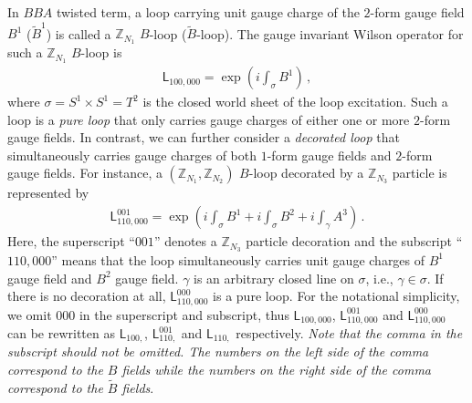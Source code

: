 \documentclass[11pt,nofootinbib,preprint]{revtex4-1}
\begin{document}
In $BBA$ twisted term, a loop carrying unit gauge charge of the $2$-form gauge field $B^1$ ($\tilde{B}^1$) is called a $\mathbb{Z} _{N_1}$ $B$-loop ($\tilde{B}$-loop). The gauge invariant Wilson operator for such a $\mathbb{Z} _{N_1}$ $B$-loop is
\begin{align}
	\mathsf{L}_{100,000}=\exp \left( i\int_{\sigma}{B^1} \right)\,,
\end{align}
where $\sigma=S^1\times S^1=T^2$ is the closed world sheet of the loop excitation.  Such a loop is a \textit{pure loop} that only carries gauge charges of  either one or more $2$-form gauge fields.  In contrast, we can  further  consider a \textit{decorated loop} that simultaneously carries gauge charges of both $1$-form gauge fields and $2$-form gauge fields. For instance, a $\left( \mathbb{Z} _{N_1},\mathbb{Z} _{N_2} \right)$ $B$-loop decorated by a $\mathbb{Z} _{N_3}$ particle is represented by
\begin{align}
	\mathsf{L}_{110,000}^{001}=\exp \left( i\int_{\sigma}{B^1}+i\int_{\sigma}{B^2}+i\int_{\gamma}{A^3} \right)\,.
\end{align}
Here, the superscript ``$001$'' denotes a $\mathbb{Z} _{N_3}$ particle decoration and the subscript ``$110,000$'' means that the loop simultaneously carries unit gauge charges of $B^1$ gauge field and  $B^2$ gauge field. $\gamma$ is an arbitrary closed line on $\sigma$, i.e., $\gamma\in \sigma$. If there is no decoration at all, $\mathsf{L}_{110,000}^{000}$ is a pure loop. For the notational simplicity, we omit 000 in the superscript and subscript, thus $\mathsf{L}_{100,000}$, $\mathsf{L}_{110,000}^{001}$ and $\mathsf{L}_{110,000}^{000}$ can be rewritten as $\mathsf{L}_{100,}$, $\mathsf{L}_{110,}^{001}$ and $\mathsf{L}_{110,}$ respectively. \textit{Note that the comma in the subscript should not be omitted. The numbers on the left side of the comma correspond to the $B$ fields while the numbers on the right side of the comma correspond to the $\tilde{B}$ fields}.
\end{document}
